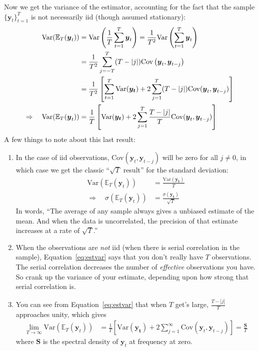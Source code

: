 \documentclass[12pt]{article}
\theoremstyle{plain}
\theoremstyle{definition}
\theoremstyle{remark}
\begin{document}
Now we get the variance of the estimator, accounting for the fact that
the sample $\{\boldsymbol{y}_t\}_{t=1}^T$ is not necessarily iid (though
assumed stationary):
\begin{align}
  \text{Var}(\mathbb{E}_T(\boldsymbol{y}_t))
  &=
  \text{Var}\left(
  \frac{1}{T}\sum^T_{t=1} \boldsymbol{y}_t
  \right)
  =
  \frac{1}{T^2}\text{Var}\left(
  \sum^T_{t=1} \boldsymbol{y}_t
  \right)\notag\\
  &=
  \frac{1}{T^2}
  \sum^T_{j=-T} (T-|j|)\text{Cov}\left(
    \boldsymbol{y}_t, \boldsymbol{y}_{t-j}
  \right) \notag\\
  &=
  \frac{1}{T^2}
  \left[
    \sum^T_{t=1} \text{Var}(\boldsymbol{y_t})
    +
    2\sum^T_{j=1} (T-|j|)\text{Cov}(\boldsymbol{y}_t,\boldsymbol{y}_{t-j})
  \right]\notag\\
  \Rightarrow\quad
  \text{Var}(\mathbb{E}_T(\boldsymbol{y}_t))
  &=
  \frac{1}{T}
  \left[
    \text{Var}(\boldsymbol{y_t})
    +
    2\sum^T_{j=1} \frac{T-|j|}{T}
    \text{Cov}(\boldsymbol{y}_t,\boldsymbol{y}_{t-j})
  \right]
  \label{eq:estvar}
\end{align}
A few things to note about this last result:
\begin{enumerate}
  \item In the case of iid observations,
    $\text{Cov}(\boldsymbol{y}_t,\boldsymbol{y}_{t-j})$ will be zero for
    all $j\neq 0$, in which case we get the classic ``$\sqrt{T}$
    result'' for the standard deviation:
    \begin{align*}
      \text{Var}(\mathbb{E}_T(\boldsymbol{y}_t))
      &=
      \frac{\text{Var}(\boldsymbol{y_t})}{T}\\
      \Rightarrow\quad
      \sigma(\mathbb{E}_T(\boldsymbol{y}_t))
      &=
      \frac{\sigma(\boldsymbol{y_t})}{\sqrt{T}}
    \end{align*}
    In words, ``The average of any sample always gives a unbiased
    estimate of the mean. And when the data is uncorrelated, the
    precision of that estimate increases at a rate of $\sqrt{T}$.''

  \item When the observations are \emph{not} iid (when there is serial
    correlation in the sample), Equation~\ref{eq:estvar} says that you
    don't really have $T$ observations. The serial correlation decreases
    the number of \emph{effective} observations you have. So crank up
    the variance of your estimate, depending upon how strong that serial
    correlation is.

  \item
    You can see from Equation~\ref{eq:estvar} that when $T$ get's large,
    $\frac{T-|j|}{T}$ approaches unity, which gives
    \begin{align*}
      \lim_{T\rightarrow\infty}
      \text{Var}(\mathbb{E}_T(\boldsymbol{y}_t))
      &=
      \frac{1}{T}
      \left[
        \text{Var}(\boldsymbol{y_t})
        +
        2\sum^\infty_{j=1}
        \text{Cov}(\boldsymbol{y}_t,\boldsymbol{y}_{t-j})
      \right]
      =
      \frac{\boldsymbol{S}}{T}
    \end{align*}
    where $\boldsymbol{S}$ is the spectral density of $\boldsymbol{y}_t$
    at frequency at zero.
\end{enumerate}
\end{document}
